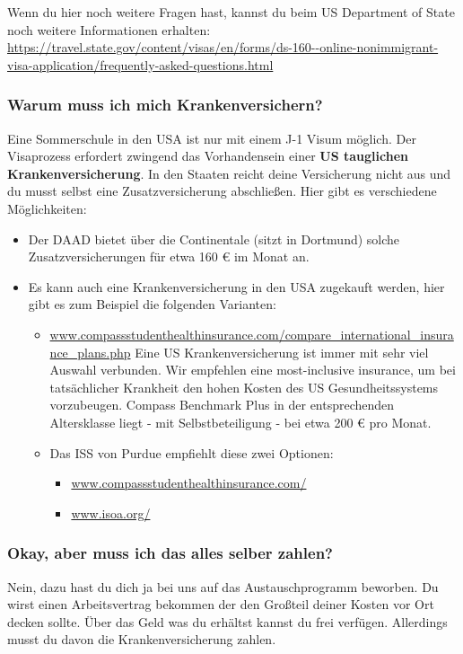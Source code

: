 \documentclass[
  paper=a4,
  fontsize=12pt,
  DIV=16,
  headheight=52pt,
  footheight=45pt,
  headinclude,
  parskip=full,
]{scrartcl}
\begin{document}
Wenn du hier noch weitere Fragen hast, kannst du beim US Department of State
noch weitere Informationen erhalten:
\url{https://travel.state.gov/content/visas/en/forms/ds-160--online-nonimmigrant-visa-application/frequently-asked-questions.html}

\subsubsection*{Warum muss ich mich Krankenversichern?}
Eine Sommerschule in den USA ist nur mit einem J-1 Visum möglich.
Der Visaprozess erfordert zwingend das Vorhandensein einer
\textbf{US tauglichen Krankenversicherung}.
In den Staaten reicht deine Versicherung nicht aus und du musst selbst eine
Zusatzversicherung abschließen.
Hier gibt es verschiedene Möglichkeiten:
\begin{itemize}
  \item Der DAAD bietet über die Continentale (sitzt in Dortmund) solche
  Zusatzversicherungen für etwa 160 € im Monat an.
  \item Es kann auch eine Krankenversicherung in den USA zugekauft werden, hier
  gibt es zum Beispiel die folgenden Varianten:
  \begin{itemize}
    \item \url{www.compassstudenthealthinsurance.com/compare_international_insurance_plans.php}
    Eine US Krankenversicherung ist immer mit sehr viel Auswahl verbunden.
    Wir empfehlen eine most-inclusive insurance, um bei tatsächlicher Krankheit
    den hohen Kosten des US Gesundheitssystems vorzubeugen.
    Compass Benchmark Plus in der entsprechenden Altersklasse liegt - mit
    Selbstbeteiligung - bei etwa 200 € pro Monat.
    \item Das ISS von Purdue empfiehlt diese zwei Optionen:
    \begin{itemize}
      \item \url{www.compassstudenthealthinsurance.com/}
      \item \url{www.isoa.org/}
    \end{itemize}
  \end{itemize}
\end{itemize}

\subsubsection*{Okay, aber muss ich das alles selber zahlen?}
Nein, dazu hast du dich ja bei uns auf das Austauschprogramm beworben.
Du wirst einen Arbeitsvertrag bekommen der den Großteil deiner Kosten vor Ort
decken sollte.
Über das Geld was du erhältst kannst du frei verfügen.
Allerdings musst du davon die Krankenversicherung zahlen.
\end{document}
